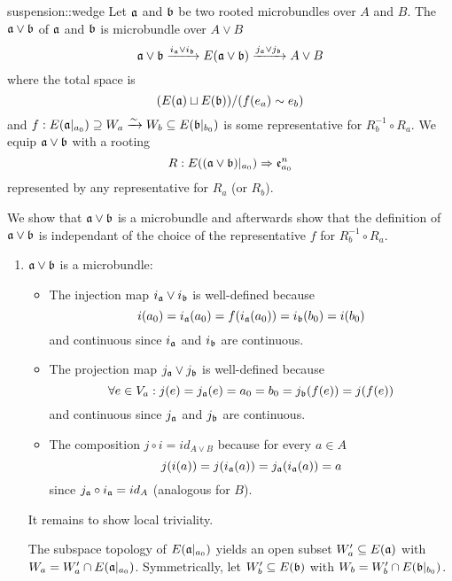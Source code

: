 \begin{mydefinition}{suspension::wedge}
    Let $\mathfrak{a}$ and $\mathfrak{b}$ be two rooted microbundles over $A$ and $B$.
    The  $\mathfrak{a} \vee \mathfrak{b}$ of $\mathfrak{a}$ and $\mathfrak{b}$ is microbundle over $A \vee B$
    \[ \mathfrak{a} \vee \mathfrak{b} \xrightarrow{i_{\mathfrak{a}} \vee i_{\mathfrak{b}}} E(\mathfrak{a} \vee \mathfrak{b}) \xrightarrow{j_{\mathfrak{a}} \vee j_{\mathfrak{b}}} A \vee B \]
    where the total space is
    \[ (E(\mathfrak{a}) \sqcup E(\mathfrak{b})) / (f(e_a) \sim e_b) \]
    and $f: E(\mathfrak{a}\vert_{a_0}) \supseteq{} W_a \xrightarrow{\sim} W_b \subseteq{} E(\mathfrak{b}\vert_{b_0})$ is some representative for $R_b^{-1} \circ R_a$.
    We equip $\mathfrak{a} \vee \mathfrak{b}$ with a rooting
    \[ R: E((\mathfrak{a} \vee \mathfrak{b})\vert_{a_0}) \Rightarrow{} \mathfrak{e}^{n}_{a_0} \]
    represented by any representative for $R_a$ (or $R_b$).
\end{mydefinition}
\begin{myproof}
    We show that $\mathfrak{a} \vee \mathfrak{b}$ is a microbundle and afterwards show
    that the definition of $\mathfrak{a} \vee \mathfrak{b}$ is independant of the choice of the representative $f$ for $R_b^{-1} \circ R_a$.
    \begin{enumerate}
        \item $\mathfrak{a} \vee \mathfrak{b}$ is a microbundle:
        \begin{itemize}
            \item The injection map $i_{\mathfrak{a}} \vee i_{\mathfrak{b}}$ is well-defined because 
            \[ i(a_0) = i_{\mathfrak{a}}(a_0) = f(i_{\mathfrak{a}}(a_0)) = i_{\mathfrak{b}}(b_0) = i(b_0) \]
            and continuous since $i_{\mathfrak{a}}$ and $i_{\mathfrak{b}}$ are continuous.
            \item The projection map $j_{\mathfrak{a}} \vee j_{\mathfrak{b}}$ is well-defined because
            \[ \forall e \in V_a: j(e) = j_{\mathfrak{a}}(e) = a_0 = b_0 = j_{\mathfrak{b}}(f(e)) = j(f(e)) \]
            and continuous since $j_{\mathfrak{a}}$ and $j_{\mathfrak{b}}$ are continuous.
            \item The composition $j \circ i = id_{A \vee B}$ because for every $a \in A$
            \[ j(i(a)) = j(i_{\mathfrak{a}}(a)) = j_{\mathfrak{a}}(i_{\mathfrak{a}}(a)) = a \]
            since $j_{\mathfrak{a}} \circ i_{\mathfrak{a}} = id_A$ (analogous for $B$).
        \end{itemize}
        It remains to show local triviality.

        The subspace topology of $E(\mathfrak{a}\vert_{a_0})$ yields an open subset $W_a' \subseteq{} E(\mathfrak{a})$ with $W_a = W_a' \cap E(\mathfrak{a}\vert_{a_0})$.
        Symmetrically, let $W_b' \subseteq{} E(\mathfrak{b})$ with $W_b = W_b' \cap E(\mathfrak{b}\vert_{b_0})$.


\end{enumerate}
\end{myproof}
